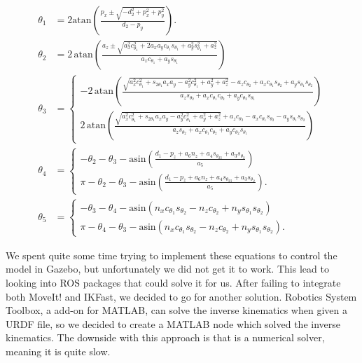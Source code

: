 \documentclass[11pt,a4paper, titlepage]{article}
\begin{document}
	\begin{align*}
\theta_1 &= 2\mathrm{atan}\left(\frac{p_x \pm \sqrt{-d_2^2 + p_x^2 +p_y^2}}{d_2 - p_y}\right). \\[10pt]
\theta_2 &= 2\,\mathrm{atan}\left(\frac{a_z \pm \sqrt{a_x^2c_{\theta_1}^2+2a_xa_yc_{\theta_1}s_{\theta_1}+a_y^2s_{\theta_1}^2+a_z^2}}{a_xc_{\theta_1} + a_ys_{\theta_1}}\right) \\[10pt]
\theta_3 &= 
\begin{cases}
-2\,\mathrm{atan}\left(\frac{\sqrt{a_x^2c_{\theta_1}^2 + s_{2\theta_1}a_xa_y-a_y^2c_{\theta_1}^2 + a_y^2 + a_z^2} - a_zc_{\theta_2}+a_xc_{\theta_1}s_{\theta_2}+a_ys_{\theta_1}s_{\theta_2}}{a_zs_{\theta_2} + a_xc_{\theta_1}c_{\theta_2} + a_yc_{\theta_2}s_{\theta_1}}\right) \\[10pt]
2\,\mathrm{atan}\left(\frac{\sqrt{a_x^2c_{\theta_1}^2 + s_{2\theta_1}a_xa_y-a_y^2c_{\theta_1}^2 + a_y^2 + a_z^2} + a_zc_{\theta_2} - a_xc_{\theta_1}s_{\theta_2} - a_ys_{\theta_1}s_{\theta_2}}{a_zs_{\theta_2} + a_xc_{\theta_1}c_{\theta_2} + a_yc_{\theta_2}s_{\theta_1}}\right)
\end{cases} \\[10pt]
\theta_4 &= \begin{cases}
-\theta_2 - \theta_3 - \mathrm{asin}\left(\frac{d_1 - p_z + a_6n_z + a_4s_{\theta_{23}} + a_3s_{\theta_2}}{a_5}\right) \\[5pt]
\pi -\theta_2 - \theta_3 - \mathrm{asin}\left(\frac{d_1 - p_z + a_6n_z + a_4s_{\theta_{23}} + a_3s_{\theta_2}}{a_5}\right).
\end{cases} \\[10pt]
\theta_5 &= 
\begin{cases}
-\theta_3 - \theta_4 - \mathrm{asin}(n_xc_{\theta_1}s_{\theta_2} - n_zc_{\theta_2} + n_ys_{\theta_1}s_{\theta_2}) \\[5pt]
\pi - \theta_4 - \theta_3 - \mathrm{asin}(n_xc_{\theta_1}s_{\theta_2} - n_zc_{\theta_2} + n_ys_{\theta_1}s_{\theta_2}).
\end{cases}
\end{align*}

We spent quite some time trying to implement these equations to control the model in Gazebo, but unfortunately we did not get it to work. This lead to looking into ROS packages that could solve it for us. After failing to integrate both MoveIt! and  IKFast, we decided to go for another solution. Robotics System Toolbox, a add-on for MATLAB, can solve the inverse kinematics when given a URDF file, so we decided to create a MATLAB node which solved the inverse kinematics. The downside with this approach is that is a numerical solver, meaning it is quite slow.
\end{document}
